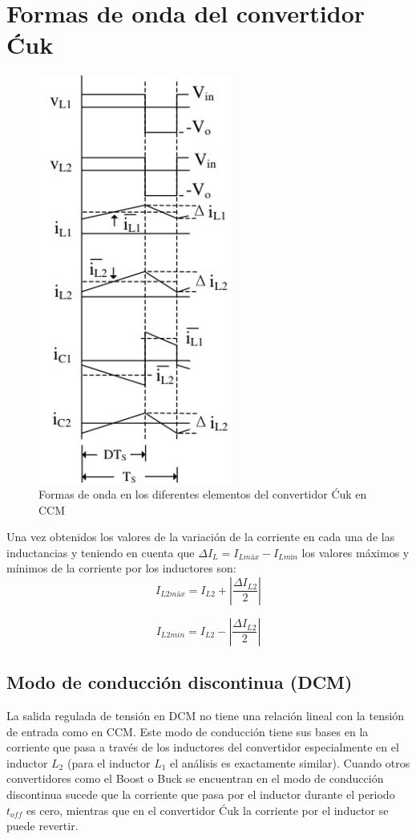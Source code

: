 \documentclass[conference]{IEEEtran}
\begin{document}
\section{Formas de onda del convertidor Ćuk}

\begin{figure}[h!]
    \centering
    \includegraphics[scale=0.8]{imagenes/forma de onda.jpg}
    \caption{Formas de onda en los diferentes elementos del convertidor Ćuk en CCM}
    \label{fig: forma de odna}
\end{figure}

Una vez obtenidos los valores de la variación de la corriente en cada una de las inductancias y teniendo en cuenta que $\Delta I_L=I_{Lmáx}-I_{Lmín}$ los valores máximos y mínimos de la corriente por los inductores son:
\begin{equation}
    I_{L2máx}=I_{L2}+ \left| \frac{\Delta I_{L2}}{2} \right| 
\end{equation}

\begin{equation}
    I_{L2min}=I_{L2}- \left| \frac{\Delta I_{L2}}{2} \right| 
\end{equation}

\subsection{Modo de conducción discontinua (DCM)}
La salida regulada de tensión en DCM no tiene una relación lineal con la tensión de entrada como
en CCM. Este modo de conducción tiene sus bases en la corriente que pasa a través de los inductores del convertidor especialmente en el inductor $L_2$ (para el inductor $L_1$ el análisis es exactamente similar). Cuando otros convertidores como el Boost o Buck se encuentran en el modo de conducción discontinua sucede que la corriente que pasa por el inductor durante el periodo $t_{off}$ es cero, mientras que en el convertidor Ćuk la corriente por el inductor se puede revertir.
\end{document}
